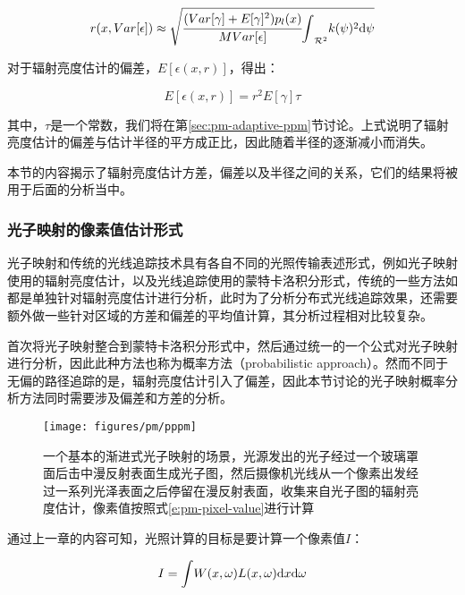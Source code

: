 \begin{equation}
	r(x,Var[\epsilon])\approx\sqrt{ \cfrac{(Var[\gamma]+E[\gamma]^{2})p_l(x)}{MVar[\epsilon]}{\rm \int}_{\mathcal{R}^{2}}k(\psi)^{2}{\rm d}\psi}
\end{equation}

对于辐射亮度估计的偏差，$E[\epsilon (x,r)]$，\cite{a:ProgressivePhotonMappingAProbabilisticApproach}得出：

\begin{equation}
	E[\epsilon (x,r)]=r^{2}E[\gamma]\tau
\end{equation}

其中，$\tau$是一个常数，我们将在第\ref{sec:pm-adaptive-ppm}节讨论。上式说明了辐射亮度估计的偏差与估计半径的平方成正比，因此随着半径的逐渐减小而消失。

本节的内容揭示了辐射亮度估计方差，偏差以及半径之间的关系，它们的结果将被用于后面的分析当中。



\subsubsection{光子映射的像素值估计形式}
光子映射和传统的光线追踪技术具有各自不同的光照传输表述形式，例如光子映射使用的辐射亮度估计，以及光线追踪使用的蒙特卡洛积分形式，传统的一些方法如\cite{a:AProgressiveErrorEstimationFrameworkforPhotonDensityEstimation}都是单独针对辐射亮度估计进行分析，此时为了分析分布式光线追踪效果，还需要额外做一些针对区域的方差和偏差的平均值计算，其分析过程相对比较复杂。

\cite{a:ProgressivePhotonMappingAProbabilisticApproach}首次将光子映射整合到蒙特卡洛积分形式中，然后通过统一的一个公式对光子映射进行分析，因此此种方法也称为概率方法（probabilistic approach）。然而不同于无偏的路径追踪的是，辐射亮度估计引入了偏差，因此本节讨论的光子映射概率分析方法同时需要涉及偏差和方差的分析。

\begin{figure}
	\sidecaption
	\texttt{[image: figures/pm/pppm]}
	\caption{一个基本的渐进式光子映射的场景，光源发出的光子经过一个玻璃罩面后击中漫反射表面生成光子图，然后摄像机光线从一个像素出发经过一系列光泽表面之后停留在漫反射表面，收集来自光子图的辐射亮度估计，像素值按照式\ref{e:pm-pixel-value}进行计算}
	\label{f:pm-pppm}
\end{figure}

通过上一章的内容可知，光照计算的目标是要计算一个像素值$I$：

\begin{equation}\label{e:pm-pixel-value} %
	I={\rm \int} W(x,\omega)L(x,\omega){\rm d}x{\rm d}\omega
\end{equation}

